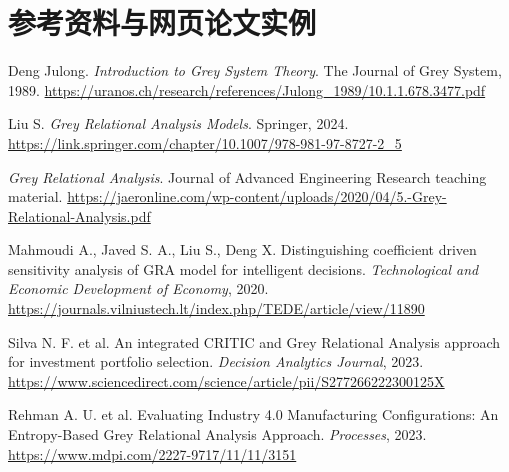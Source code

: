 \documentclass[UTF8,a4paper,11pt]{ctexart}
\begin{document}
\section*{参考资料与网页论文实例}
\begin{enumerate}[label={[\arabic*]}]
  \item Deng Julong. \textit{Introduction to Grey System Theory}. The Journal of Grey System, 1989. \url{https://uranos.ch/research/references/Julong_1989/10.1.1.678.3477.pdf}
  \item Liu S. \textit{Grey Relational Analysis Models}. Springer, 2024. \url{https://link.springer.com/chapter/10.1007/978-981-97-8727-2_5}
  \item \textit{Grey Relational Analysis}. Journal of Advanced Engineering Research teaching material. \url{https://jaeronline.com/wp-content/uploads/2020/04/5.-Grey-Relational-Analysis.pdf}
  \item Mahmoudi A., Javed S. A., Liu S., Deng X. Distinguishing coefficient driven sensitivity analysis of GRA model for intelligent decisions. \textit{Technological and Economic Development of Economy}, 2020. \url{https://journals.vilniustech.lt/index.php/TEDE/article/view/11890}
  \item Silva N. F. et al. An integrated CRITIC and Grey Relational Analysis approach for investment portfolio selection. \textit{Decision Analytics Journal}, 2023. \url{https://www.sciencedirect.com/science/article/pii/S277266222300125X}
  \item Rehman A. U. et al. Evaluating Industry 4.0 Manufacturing Configurations: An Entropy-Based Grey Relational Analysis Approach. \textit{Processes}, 2023. \url{https://www.mdpi.com/2227-9717/11/11/3151}
\end{enumerate}
\end{document}
